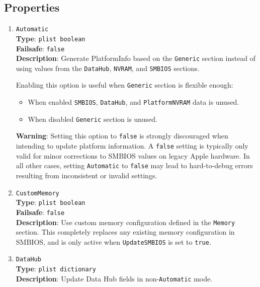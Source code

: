 \documentclass[]{article}
\providecommand{\tightlist}{%
  \setlength{\itemsep}{0pt}\setlength{\parskip}{0pt}}
\begin{document}
\subsection{Properties}\label{platforminfoprops}

\begin{enumerate}

\item
  \texttt{Automatic}\\
  \textbf{Type}: \texttt{plist\ boolean}\\
  \textbf{Failsafe}: \texttt{false}\\
  \textbf{Description}: Generate PlatformInfo based on the \texttt{Generic}
  section instead of using values from the \texttt{DataHub}, \texttt{NVRAM},
  and \texttt{SMBIOS} sections.

  Enabling this option is useful when \texttt{Generic} section is flexible
  enough:
  \begin{itemize}
  \tightlist
  \item When enabled \texttt{SMBIOS}, \texttt{DataHub}, and
  \texttt{PlatformNVRAM} data is unused.
  \item When disabled \texttt{Generic} section is unused.
  \end{itemize}

  \textbf{Warning}: Setting this option to \texttt{false} is strongly discouraged when
  intending to update platform information. A \texttt{false} setting is typically only
  valid for minor corrections to SMBIOS values on legacy Apple hardware. In all other
  cases, setting \texttt{Automatic} to \texttt{false} may lead to hard-to-debug errors
  resulting from inconsistent or invalid settings.

\item
  \texttt{CustomMemory}\\
  \textbf{Type}: \texttt{plist\ boolean}\\
  \textbf{Failsafe}: \texttt{false}\\
  \textbf{Description}: Use custom memory configuration defined in the
  \texttt{Memory} section. This completely replaces any existing memory
  configuration in SMBIOS, and is only active when \texttt{UpdateSMBIOS}
  is set to \texttt{true}.

\item
  \texttt{DataHub}\\
  \textbf{Type}: \texttt{plist\ dictionary}\\
  \textbf{Description}: Update Data Hub fields in non-\texttt{Automatic} mode.


\end{enumerate}
\end{document}

